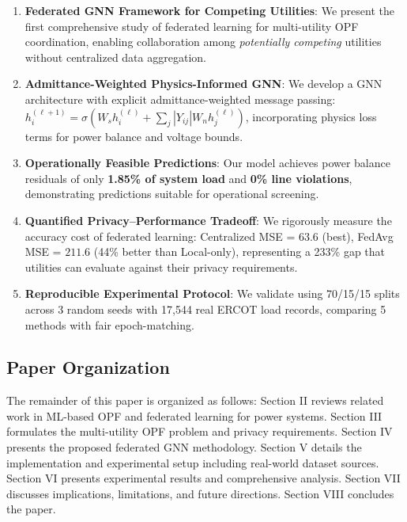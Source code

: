 \documentclass[journal,10pt]{IEEEtran}
\begin{document}
\begin{enumerate}
    \item \textbf{Federated GNN Framework for Competing Utilities}: We present the first comprehensive study of federated learning for multi-utility OPF coordination, enabling collaboration among \textit{potentially competing} utilities without centralized data aggregation.
    
    \item \textbf{Admittance-Weighted Physics-Informed GNN}: We develop a GNN architecture with explicit admittance-weighted message passing: $h_i^{(\ell+1)} = \sigma(W_s h_i^{(\ell)} + \sum_{j} |Y_{ij}| W_n h_j^{(\ell)})$, incorporating physics loss terms for power balance and voltage bounds.
    
    \item \textbf{Operationally Feasible Predictions}: Our model achieves power balance residuals of only \textbf{1.85\% of system load} and \textbf{0\% line violations}, demonstrating predictions suitable for operational screening.
    
    \item \textbf{Quantified Privacy--Performance Tradeoff}: We rigorously measure the accuracy cost of federated learning: Centralized MSE = $63.6$ (best), FedAvg MSE = $211.6$ (44\% better than Local-only), representing a 233\% gap that utilities can evaluate against their privacy requirements.
    
    \item \textbf{Reproducible Experimental Protocol}: We validate using 70/15/15 splits across 3 random seeds with 17,544 real ERCOT load records, comparing 5 methods with fair epoch-matching.
\end{enumerate}

\subsection{Paper Organization}

The remainder of this paper is organized as follows: Section II reviews related work in ML-based OPF and federated learning for power systems. Section III formulates the multi-utility OPF problem and privacy requirements. Section IV presents the proposed federated GNN methodology. Section V details the implementation and experimental setup including real-world dataset sources. Section VI presents experimental results and comprehensive analysis. Section VII discusses implications, limitations, and future directions. Section VIII concludes the paper.
\end{document}
